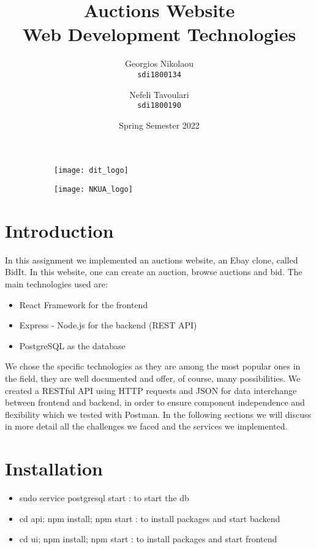 \documentclass{article}
\title{%
\HUGE
 Auctions Website \\ Web Development Technologies }
\begin{document}
\author{\Large
  Georgios Nikolaou\\
   \texttt{\large sdi1800134}
  \and
  \Large
  Nefeli Tavoulari\\
   \texttt{\large sdi1800190}
}
\date{Spring Semester 2022}
\maketitle
\begin{figure}
\centering
\begin{subfigure}
  \centering
  \texttt{[image: dit\_logo]}
  \label{fig:sub1}
\end{subfigure}%
\begin{subfigure}
  \centering
  \texttt{[image: NKUA\_logo]}
  \label{fig:sub2}
\end{subfigure}
\label{fig:test}
\end{figure}


\newpage
\tableofcontents
\newpage
\section{Introduction} 
In this assignment we implemented an auctions website, an Ebay clone, called BidIt. In this website, one can create an auction, browse auctions and bid.
The main technologies used are:
\begin{itemize}
    \item React Framework for the frontend
    \item Express - Node.js for the backend (REST API)
    \item PostgreSQL as the database
\end{itemize}
We chose the specific technologies as they are among the most popular ones in the field, they are well documented and offer, of course, many possibilities. We created a RESTful API using HTTP requests and JSON for data interchange between frontend and backend, in order to ensure component independence and flexibility which we tested with Postman. In the following sections we will discuss in more detail all the challenges we faced and the services we implemented.
\section{Installation}
\begin{itemize}
\item sudo service postgresql start : to start the db
\item cd api; npm install; npm start : to install packages and start backend
\item cd ui; npm install; npm start : to install packages and start frontend
\end{itemize}
\end{document}
